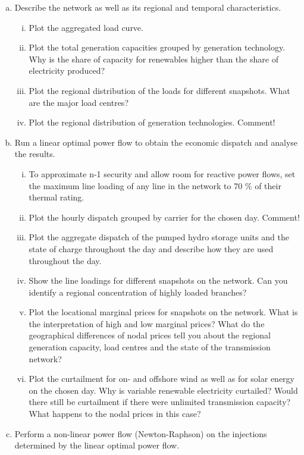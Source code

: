 \documentclass[11pt,a4paper,fleqn]{scrartcl}
\begin{document}
\begin{enumerate}[(a)]
 \item Describe the network as well as its regional and temporal characteristics.
       \begin{enumerate}[(i)]
        \item Plot the aggregated load curve.
        \item Plot the total generation capacities grouped by generation technology. Why is the share of capacity for renewables higher than the share of electricity produced?
        \item Plot the regional distribution of the loads for different snapshots. What are the major load centres?
        \item Plot the regional distribution of generation technologies. Comment!
       \end{enumerate}
 \item Run a linear optimal power flow to obtain the economic dispatch and analyse the results.
       \begin{enumerate}[(i)]
        \item To approximate n-1 security and allow room for reactive power flows, set the maximum line loading of any line in the network to 70 \% of their thermal rating.
        \item Plot the hourly dispatch grouped by carrier for the chosen day. Comment!
        \item Plot the aggregate dispatch of the pumped hydro storage units and the state of charge throughout the day and describe how they are used throughout the day.
        \item Show the line loadings for different snapshots on the network. Can you identify a regional concentration of highly loaded branches?
        \item Plot the locational marginal prices for snapshots on the network. What is the interpretation of high and low marginal prices? What do the geographical differences of nodal prices tell you about the regional generation capacity, load centres and the state of the transmission network?
        \item Plot the curtailment for on- and offshore wind as well as for solar energy on the chosen day. Why is variable renewable electricity curtailed?  Would there still be curtailment if there were unlimited transmission capacity? What happens to the nodal prices in this case?
       \end{enumerate}
 \item Perform a non-linear power flow (Newton-Raphson) on the injections determined by the linear optimal power flow.

\end{enumerate}
\end{document}
